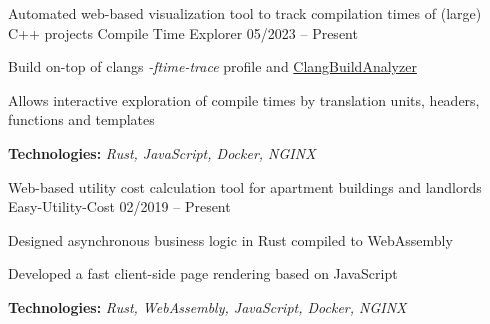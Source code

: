 \vspace*{-5.0mm}
\begin{cventries}
  \cventry
    {Automated web-based visualization tool to track compilation times of (large) C++ projects}
    {Compile Time Explorer}
    {}
    {05/2023 -- Present}
    {
      \begin{cvitems}
        \item {Build on-top of clangs \textit{-ftime-trace} profile and \href{https://github.com/aras-p/ClangBuildAnalyzer}{ClangBuildAnalyzer}}
        \item {Allows interactive exploration of compile times by translation units, headers, functions and templates}
        \item {\textbf{Technologies:} \textit{Rust, JavaScript, Docker, NGINX}}
      \end{cvitems}
    }
  \cventry
    {Web-based utility cost calculation tool for apartment buildings and landlords}
    {Easy-Utility-Cost}
    {}
    {02/2019 -- Present}
    {
      \begin{cvitems}
        \item {Designed asynchronous business logic in Rust compiled to WebAssembly}
        \item {Developed a fast client-side page rendering based on JavaScript}
        \item {\textbf{Technologies:} \textit{Rust, WebAssembly, JavaScript, Docker, NGINX}}
      \end{cvitems}
    }
\end{cventries}
